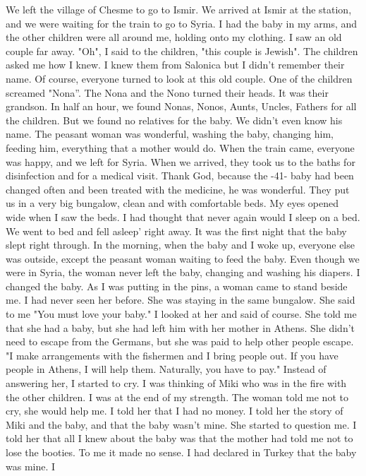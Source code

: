 We left the village of Chesme to go to Ismir. We arrived at Ismir at the station, and we were waiting for the train to go to Syria. I had the baby in my arms, and the other children were all around me, holding onto my clothing. I saw an old couple far away. 
"Oh", I said to the children, "this couple is Jewish". The children asked me how I knew. I 
knew them from Salonica but I didn't remember their name. Of course, everyone turned to look at this old couple. One of the children screamed "Nona”.
The Nona and the Nono turned their heads. It was their grandson. In half an hour, we found Nonas, Nonos, Aunts, Uncles, Fathers for all the children. But we found no relatives for the baby. We didn't even know his name.
The peasant woman was wonderful, washing the baby, changing him, feeding him, everything that a mother would do. When the train came, everyone 
was happy, and we left for Syria. When we arrived, they took us to the 
baths for disinfection and for a medical visit. Thank God, because the 
-41- 
baby had been changed often and been treated with the medicine, he was 
wonderful. They put us in a very big bungalow, clean and with comfortable 
beds. My eyes opened wide when I saw the beds. I had thought that never 
again would I sleep on a bed. We went to bed and fell asleep' right away. 
It was the first night that the baby slept right through. In the morning, when the baby and I woke up, everyone else was outside, except the peasant woman waiting to feed the baby. Even though we were in Syria, the woman never left the baby, changing and washing his diapers. 
I changed the baby. As I was putting in the pins, a woman came to 
stand beside me. I had never seen her before. She was staying in the same bungalow. She said to me "You must love your baby." I looked at her and said of course. She told me that she had a baby, but she had left him with her mother in Athens. She didn't need to escape from the Germans, but she was paid to help other people escape. "I make arrangements with the 
fishermen and I bring people out. If you have people in Athens, I will help them. Naturally, you have to pay." Instead of answering her, I started to cry. I was thinking of Miki who was in the fire with the other children. I was at the end of my strength. The woman told me not to cry, she would help me. I told her that I had no money. 
I told her the story of Miki and the baby, and that the baby wasn't mine. She started to question me. I told her that all I knew about the baby was that the mother had told me not to lose the booties. To me it made no sense. I had declared in Turkey that the baby was mine. I 
